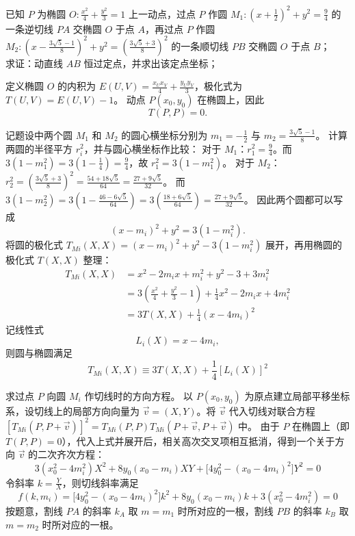 \begin{exercise}
已知 \(P\) 为椭圆 \(O: \frac{x^2}{4} + \frac{y^2}{3} = 1\) 上一动点，过点 \(P\) 作圆 \(M_1: \left(x + \frac{1}{2}\right)^2 + y^2 = \frac{9}{4}\) 的一条逆切线 \(PA\) 交椭圆 \(O\) 于点 \(A\)，再过点 \(P\) 作圆 \(M_2: \left(x - \frac{3\sqrt{5} - 1}{8}\right)^2 + y^2 = \left(\frac{3\sqrt{5} + 3}{8}\right)^2\) 的一条顺切线 \(PB\) 交椭圆 \(O\) 于点 \(B\)；\\
求证：动直线 \(AB\) 恒过定点，并求出该定点坐标；
\end{exercise}
\begin{solution}
定义椭圆 $O$ 的内积为 $E(U,V) = \frac{x_U x_V}{4} + \frac{y_U y_V}{3}$，极化式为 $T(U,V) = E(U,V) - 1$。
动点 $P(x_0, y_0)$ 在椭圆上，因此
$$T(P,P) = 0.$$

记题设中两个圆 $M_1$ 和 $M_2$ 的圆心横坐标分别为 $m_1 = -\frac{1}{2}$ 与 $m_2 = \frac{3\sqrt{5} - 1}{8}$。
计算两圆的半径平方 $r_i^2$，并与圆心横坐标作比较：
对于 $M_1$：$r_1^2 = \frac{9}{4}$。而 $3(1 - m_1^2) = 3(1 - \frac{1}{4}) = \frac{9}{4}$，故 $r_1^2 = 3(1 - m_1^2)$。
对于 $M_2$：$r_2^2 = \left(\frac{3\sqrt{5} + 3}{8}\right)^2 = \frac{54 + 18\sqrt{5}}{64} = \frac{27 + 9\sqrt{5}}{32}$。
而 $3(1 - m_2^2) = 3\left(1 - \frac{46 - 6\sqrt{5}}{64}\right) = 3\left(\frac{18 + 6\sqrt{5}}{64}\right) = \frac{27 + 9\sqrt{5}}{32}$。
因此两个圆都可以写成
$$(x - m_i)^2 + y^2 = 3(1 - m_i^2).$$
将圆的极化式 $T_{Mi}(X,X) = (x - m_i)^2 + y^2 - 3(1 - m_i^2)$ 展开，再用椭圆的极化式 $T(X,X)$ 整理：
\begin{align*}
T_{Mi}(X,X) &= x^2 - 2m_i x + m_i^2 + y^2 - 3 + 3m_i^2 \\
&= 3\left(\frac{x^2}{4} + \frac{y^2}{3} - 1\right) + \frac{1}{4}x^2 - 2m_i x + 4m_i^2 \\
&= 3T(X,X) + \frac{1}{4}(x - 4m_i)^2
\end{align*}
记线性式
$$L_i(X) = x - 4m_i,$$
则圆与椭圆满足
$$ T_{Mi}(X,X) \equiv 3T(X,X) + \frac{1}{4}[L_i(X)]^2 $$

求过点 $P$ 向圆 $M_i$ 作切线时的方向方程。
以 $P(x_0, y_0)$ 为原点建立局部平移坐标系，设切线上的局部方向向量为 $\vec{v} = (X, Y)$。将 $\vec{v}$ 代入切线对联合方程 $[T_{Mi}(P, P+\vec{v})]^2 = T_{Mi}(P,P) T_{Mi}(P+\vec{v}, P+\vec{v})$ 中。
由于 $P$ 在椭圆上（即 $T(P,P) = 0$），代入上式并展开后，相关高次交叉项相互抵消，得到一个关于方向 $\vec{v}$ 的二次齐次方程：
$$ 3(x_0^2 - 4m_i^2) X^2 + 8y_0(x_0 - m_i) XY + \big[4y_0^2 - (x_0 - 4m_i)^2\big] Y^2 = 0 $$
令斜率 $k = \frac{Y}{X}$，则切线斜率满足
$$ f(k, m_i) = \big[4y_0^2 - (x_0 - 4m_i)^2\big] k^2 + 8y_0(x_0 - m_i) k + 3(x_0^2 - 4m_i^2) = 0 $$
按题意，割线 $PA$ 的斜率 $k_A$ 取 $m = m_1$ 时所对应的一根，割线 $PB$ 的斜率 $k_B$ 取 $m = m_2$ 时所对应的一根。


\end{solution}

